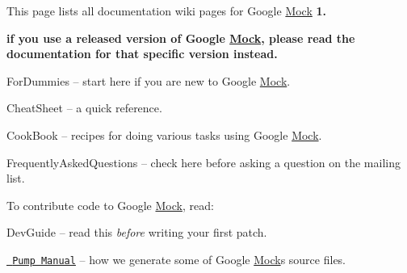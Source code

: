 This page lists all documentation wiki pages for Google \mbox{\hyperlink{class_mock}{Mock}} {\bfseries{1.}}
\begin{DoxyItemize}
\item {\bfseries{if you use a released version of Google \mbox{\hyperlink{class_mock}{Mock}}, please read the documentation for that specific version instead.}}
\begin{DoxyItemize}
\item For\+Dummies -- start here if you are new to Google \mbox{\hyperlink{class_mock}{Mock}}.
\item Cheat\+Sheet -- a quick reference.
\item Cook\+Book -- recipes for doing various tasks using Google \mbox{\hyperlink{class_mock}{Mock}}.
\item Frequently\+Asked\+Questions -- check here before asking a question on the mailing list.
\end{DoxyItemize}
\end{DoxyItemize}

To contribute code to Google \mbox{\hyperlink{class_mock}{Mock}}, read\+:


\begin{DoxyItemize}
\item Dev\+Guide -- read this {\itshape before} writing your first patch.
\item \href{http://code.google.com/p/googletest/wiki/V1_6_PumpManual}{\texttt{ Pump Manual}} -- how we generate some of Google \mbox{\hyperlink{class_mock}{Mock}}\textquotesingle{}s source files. 
\end{DoxyItemize}